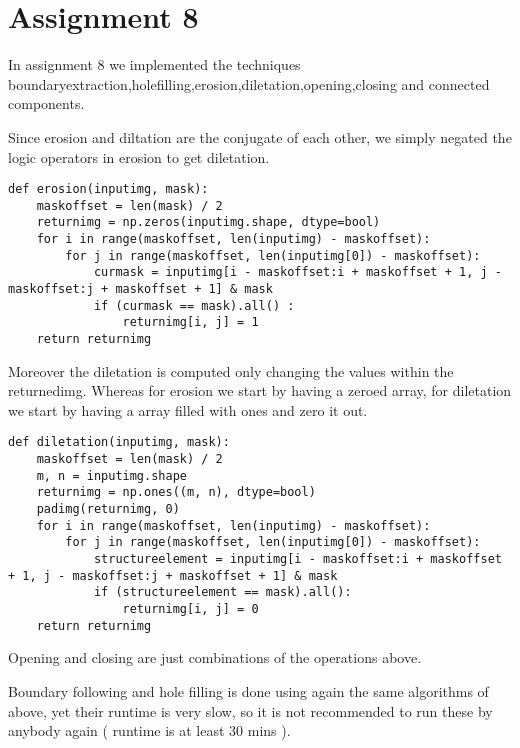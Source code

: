 \section{Assignment 8}

In assignment 8 we implemented the techniques boundaryextraction,holefilling,erosion,diletation,opening,closing and connected components.

Since erosion and diltation are the conjugate of each other, we simply negated the logic operators in erosion to get diletation.
\begin{verbatim}
def erosion(inputimg, mask):
    maskoffset = len(mask) / 2
    returnimg = np.zeros(inputimg.shape, dtype=bool)
    for i in range(maskoffset, len(inputimg) - maskoffset):
        for j in range(maskoffset, len(inputimg[0]) - maskoffset):
            curmask = inputimg[i - maskoffset:i + maskoffset + 1, j - maskoffset:j + maskoffset + 1] & mask
            if (curmask == mask).all() :
                returnimg[i, j] = 1
    return returnimg               
\end{verbatim}

Moreover the diletation is computed only changing the values within the returnedimg. Whereas for erosion we start by having a zeroed array, for diletation we start by having a array filled with ones and zero it out.
\begin{verbatim}
def diletation(inputimg, mask):
    maskoffset = len(mask) / 2
    m, n = inputimg.shape
    returnimg = np.ones((m, n), dtype=bool)
    padimg(returnimg, 0)
    for i in range(maskoffset, len(inputimg) - maskoffset):
        for j in range(maskoffset, len(inputimg[0]) - maskoffset):
            structureelement = inputimg[i - maskoffset:i + maskoffset + 1, j - maskoffset:j + maskoffset + 1] & mask
            if (structureelement == mask).all():
                returnimg[i, j] = 0
    return returnimg
\end{verbatim}

Opening and closing are just combinations of the operations above.

Boundary following and hole filling is done using again the same algorithms of above, yet their runtime is very slow, so it is not recommended to run these by anybody again ( runtime is at least 30 mins ).

